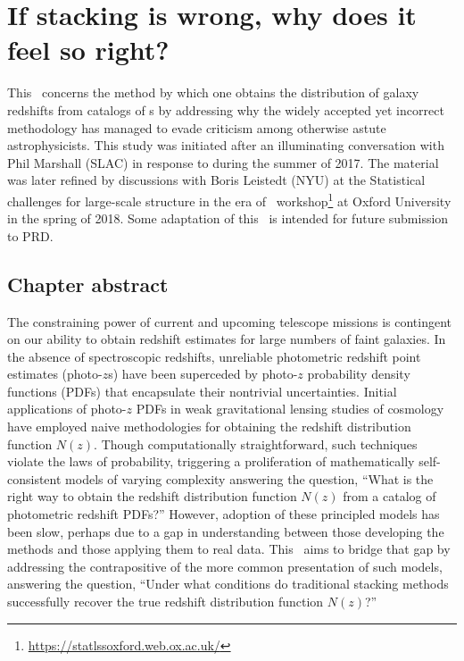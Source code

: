 \renewcommand{\chapid}{pedant}


\chapter{ If stacking is wrong, why does it feel so right?  }

This \paper\ concerns the method by which one obtains the distribution of galaxy redshifts from catalogs of \pzpdf s by addressing why the widely accepted yet incorrect methodology has managed to evade criticism among otherwise astute astrophysicists.
This study was initiated after an illuminating conversation with Phil Marshall (SLAC) in response to \citet{gruen_sumzz_2017} during the summer of 2017.
The material was later refined by discussions with Boris Leistedt (NYU) at the Statistical challenges for large-scale structure in the era of \lsst\ workshop\footnote{\url{https://statlssoxford.web.ox.ac.uk/}} at Oxford University in the spring of 2018.
Some adaptation of this \paper\ is intended for future submission to PRD.

\section*{Chapter abstract}

The constraining power of current and upcoming telescope missions is contingent on our ability to obtain redshift estimates for large numbers of faint galaxies.
In the absence of spectroscopic redshifts, unreliable photometric redshift point estimates (photo-$z$s) have been superceded by photo-$z$ probability density functions (PDFs) that encapsulate their nontrivial uncertainties.
Initial applications of photo-$z$ PDFs in weak gravitational lensing studies of cosmology have employed naive methodologies for obtaining the redshift distribution function $N(z)$.
Though computationally straightforward, such techniques violate the laws of probability, triggering a proliferation of mathematically self-consistent models of varying complexity answering the question, ``What is the right way to obtain the redshift distribution function $N(z)$ from a catalog of photometric redshift PDFs?''
However, adoption of these principled models has been slow, perhaps due to a gap in understanding between those developing the methods and those applying them to real data.
This \paper\ aims to bridge that gap by addressing the contrapositive of the more common presentation of such models, answering the question, ``Under what conditions do traditional stacking methods successfully recover the true redshift distribution function $N(z)$?''

